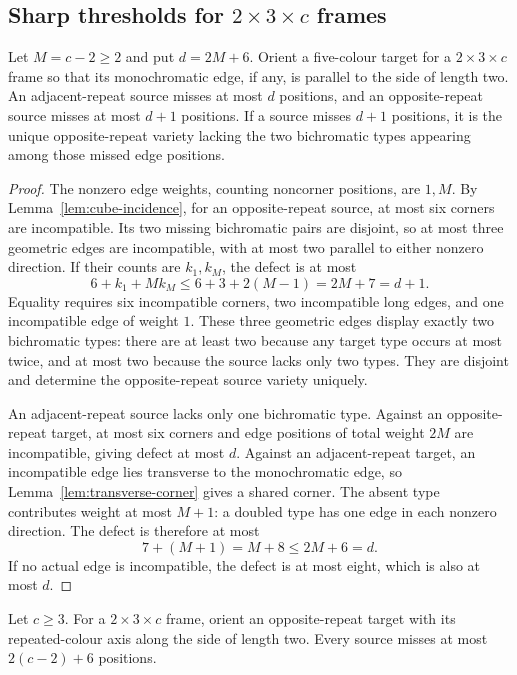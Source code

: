 \subsection[Sharp thresholds for 2 by 3 by c frames]{Sharp thresholds for $2\times3\times c$ frames}

\begin{lemma}\label{lem:23c-compatibility}
Let $M=c-2\ge2$ and put $d=2M+6$. Orient a five-colour target for
a $2\times3\times c$ frame so that its monochromatic edge, if any,
is parallel to the side of length two. An adjacent-repeat source misses
at most $d$ positions, and an opposite-repeat source misses at most
$d+1$ positions. If a source misses $d+1$ positions, it is the unique
opposite-repeat variety lacking the two bichromatic types appearing
among those missed edge positions.
\end{lemma}

\begin{proof}
The nonzero edge weights, counting noncorner positions, are $1,M$.
By Lemma~\ref{lem:cube-incidence},
for an opposite-repeat source,
at most six corners are incompatible. Its two missing bichromatic pairs
are disjoint, so at most three geometric edges are incompatible, with
at most two parallel to either nonzero direction. If their counts are
$k_1,k_M$, the defect is at most
\[
 6+k_1+Mk_M\le6+3+2(M-1)=2M+7=d+1.
\]
Equality requires six incompatible corners, two incompatible long
edges, and one incompatible edge of weight $1$. These three geometric
edges display exactly two bichromatic types: there are at least two
because any target type occurs at most twice, and at most two because
the source lacks only two types. They are disjoint and determine the
opposite-repeat source variety uniquely.

An adjacent-repeat source lacks only one bichromatic type. Against an
opposite-repeat target, at most six corners and edge positions of total
weight $2M$ are incompatible, giving defect at most $d$.
Against an adjacent-repeat target, an incompatible edge lies transverse
to the monochromatic edge, so Lemma~\ref{lem:transverse-corner}
gives a shared corner.
The absent type contributes weight at most $M+1$: a doubled type has
one edge in each nonzero direction. The defect is therefore at most
\[
 7+(M+1)=M+8\le2M+6=d.
\]
If no actual edge is incompatible, the defect is at most eight, which
is also at most $d$.
\end{proof}

\begin{lemma}
\label{lem:23c-opposite-short}
Let $c\ge3$. For a $2\times3\times c$ frame, orient an opposite-repeat target with
its repeated-colour axis along the side of length two. Every source
misses at most $2(c-2)+6$ positions.
\end{lemma}

